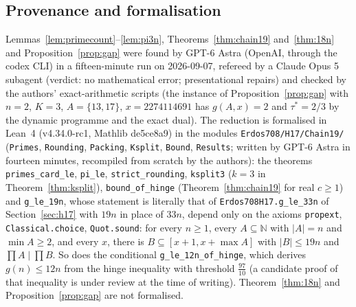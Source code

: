 \subsection*{Provenance and formalisation}
Lemmas~\ref{lem:primecount}--\ref{lem:pi3n}, Theorems~\ref{thm:chain19} and~\ref{thm:18n} and
Proposition~\ref{prop:gap} were found by GPT-6 Astra (OpenAI, through the codex CLI) in a fifteen-minute run on
2026-09-07, refereed by a Claude Opus 5 subagent (verdict: no mathematical error; presentational repairs) and checked by the authors' exact-arithmetic scripts
(the instance of Proposition~\ref{prop:gap} with $n=2$, $K=3$, $A=\{13,17\}$, $x=2274114691$ has
$g(A,x)=2$ and $\tau^*=2/3$ by the dynamic programme and the exact dual).
The reduction is formalised in Lean~4 (v4.34.0-rc1, Mathlib de5ce8a9) in the modules
\texttt{Erdos708/H17/Chain19/} (\texttt{Primes}, \texttt{Rounding}, \texttt{Packing}, \texttt{Ksplit}, \texttt{Bound},
\texttt{Results}; written by GPT-6 Astra in fourteen minutes, recompiled from scratch by the authors): the theorems
\texttt{primes\_card\_le}, \texttt{pi\_le}, \texttt{strict\_rounding}, \texttt{ksplit3} ($k=3$ in Theorem~\ref{thm:ksplit}),
\texttt{bound\_of\_hinge} (Theorem~\ref{thm:chain19} for real $c\ge1$) and \texttt{g\_le\_19n}, whose statement is
literally that of \texttt{Erdos708H17.g\_le\_33n} of Section~\ref{sec:h17} with $19n$ in place of $33n$,
depend only on the axioms \texttt{propext}, \texttt{Classical.choice}, \texttt{Quot.sound}:
for every $n\ge1$, every $A\subseteq\mathbb N$ with $|A|=n$ and $\min A\ge2$, and every $x$, there is
$B\subseteq[x+1,x+\max A]$ with $|B|\le19n$ and $\prod A\mid\prod B$. So does the conditional
\texttt{g\_le\_12n\_of\_hinge}, which derives $g(n)\le12n$ from the hinge inequality with threshold $\tfrac{97}{10}$
(a candidate proof of that inequality is under review at the time of writing). Theorem~\ref{thm:18n} and
Proposition~\ref{prop:gap} are not formalised.
